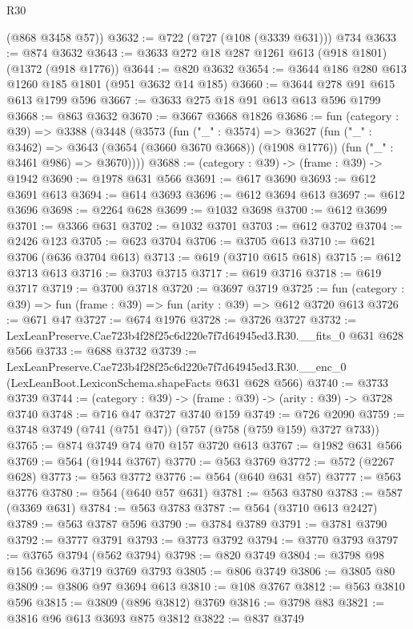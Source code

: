 \begin{lexlean}{R30}
\begin{coremodule}
      (@868 @3458 @57))
@3632 := @722 (@727 (@108 (@3339 @631))) @734
@3633 := @874 @3632
@3643 := @3633 @272 @18 @287 @1261 @613 (@918 @1801) (@1372 (@918 @1776))
@3644 := @820 @3632
@3654 := @3644 @186 @280 @613 @1260 @185 @1801 (@951 @3632 @14 @185)
@3660 := @3644 @278 @91 @615 @613 @1799 @596
@3667 := @3633 @275 @18 @91 @613 @613 @596 @1799
@3668 := @863 @3632
@3670 := @3667 @3668 @1826
@3686 := fun (category : @39) =>
  @3388
    (@3448
      (@3573
        (fun ("_" : @3574) =>
        @3627
          (fun ("_" : @3462) => @3643 (@3654 (@3660 @3670 @3668)) (@1908 @1776))
          (fun ("_" : @3461 @986) => @3670))))
@3688 := (category : @39) -> (frame : @39) -> @1942
@3690 := @1978 @631 @566
@3691 := @617 @3690
@3693 := @612 @3691 @613
@3694 := @614 @3693
@3696 := @612 @3694 @613
@3697 := @612 @3696
@3698 := @2264 @628
@3699 := @1032 @3698
@3700 := @612 @3699
@3701 := @3366 @631
@3702 := @1032 @3701
@3703 := @612 @3702
@3704 := @2426 @123
@3705 := @623 @3704
@3706 := @3705 @613
@3710 := @621 @3706 (@636 @3704 @613)
@3713 := @619 (@3710 @615 @618)
@3715 := @612 @3713 @613
@3716 := @3703 @3715
@3717 := @619 @3716
@3718 := @619 @3717
@3719 := @3700 @3718
@3720 := @3697 @3719
@3725 := fun (category : @39) => fun (frame : @39) => fun (arity : @39) => @612 @3720 @613
@3726 := @671 @47
@3727 := @674 @1976
@3728 := @3726 @3727
@3732 := LexLeanPreserve.Cae723b4f28f25c6d220e7f7d64945ed3.R30.__fits_0 @631 @628 @566
@3733 := @688 @3732
@3739 := LexLeanPreserve.Cae723b4f28f25c6d220e7f7d64945ed3.R30.__enc_0
    (LexLeanBoot.LexiconSchema.shapeFacts @631 @628 @566)
@3740 := @3733 @3739
@3744 := (category : @39) -> (frame : @39) -> (arity : @39) -> @3728 @3740
@3748 := @716 @47 @3727 @3740 @159
@3749 := @726 @2090
@3759 := @3748 @3749 (@741 (@751 @47)) (@757 (@758 (@759 @159) @3727 @733))
@3765 := @874 @3749 @74 @70 @157 @3720 @613
@3767 := @1982 @631 @566
@3769 := @564 (@1944 @3767)
@3770 := @563 @3769
@3772 := @572 (@2267 @628)
@3773 := @563 @3772
@3776 := @564 (@640 @631 @57)
@3777 := @563 @3776
@3780 := @564 (@640 @57 @631)
@3781 := @563 @3780
@3783 := @587 (@3369 @631)
@3784 := @563 @3783
@3787 := @564 (@3710 @613 @2427)
@3789 := @563 @3787 @596
@3790 := @3784 @3789
@3791 := @3781 @3790
@3792 := @3777 @3791
@3793 := @3773 @3792
@3794 := @3770 @3793
@3797 := @3765 @3794 (@562 @3794)
@3798 := @820 @3749
@3804 := @3798 @98 @156 @3696 @3719 @3769 @3793
@3805 := @806 @3749
@3806 := @3805 @80
@3809 := @3806 @97 @3694 @613
@3810 := @108 @3767
@3812 := @563 @3810 @596
@3815 := @3809 (@896 @3812) @3769
@3816 := @3798 @83
@3821 := @3816 @96 @613 @3693 @875 @3812
@3822 := @837 @3749

\end{coremodule}
\end{lexlean}
